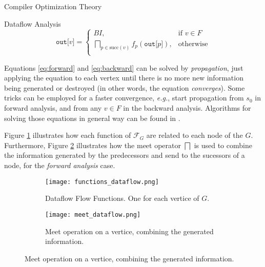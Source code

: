 \begin{section}{Compiler Optimization Theory}
\begin{subsection}{Dataflow Analysis}
\begin{equation}\label{eq:backward}
	\texttt{out[} v \texttt{]} = \begin{cases}
	  BI,& \text{if } v \in F \\
	  \bigsqcap_{p \in \text{succ}(v)}f_p(\texttt{out[}p\texttt{]}) ,& \text{otherwise} \\
	\end{cases}
\end{equation}

	Equations \ref{eq:forward} and \ref{eq:backward} can be solved by
	\textit{propagation}, just applying the equation to each vertex until
	there is no more new information being generated or destroyed (in other
	words, the equation \textit{converges}). Some tricks can be employed for a faster
	convergence, \textit{e.g.}, start propagation from $s_0$ in
	forward analysis, and from any $v \in F$ in the backward analysis.
	Algorithms for solving those equations in general way can be found in
	\citep{khedker2009data}.

	Figure \ref{fig:functions_dataflow} illustrates how each function of $\mathcal{F}_G$
	are related to each node of the $G$. Furthermore, Figure \ref{fig:meet_dataflow}
	illustrates how the meet operator $\bigsqcap$ is used to combine the information
	generated by the predecessors and send to the sucessors of a node, for
	the \textit{forward analysis} case.

\begin{figure}[ht]
\centering
  \begin{subfigure}[b]{0.40\textwidth}
	 \texttt{[image: functions\_dataflow.png]}
	  \caption{Dataflow Flow Functions. One for each vertice of $G$. \citep{khedker2009data}}
	  \label{fig:functions_dataflow}
  \end{subfigure}
  \begin{subfigure}[b]{0.40\textwidth}
	 \texttt{[image: meet\_dataflow.png]}
	  \caption{Meet operation on a vertice, combining the generated information. \citep{khedker2009data}}
	  \label{fig:meet_dataflow}
  \end{subfigure}
  \label{fig:dataflow}
\end{figure}


\end{subsection}
\end{section}
